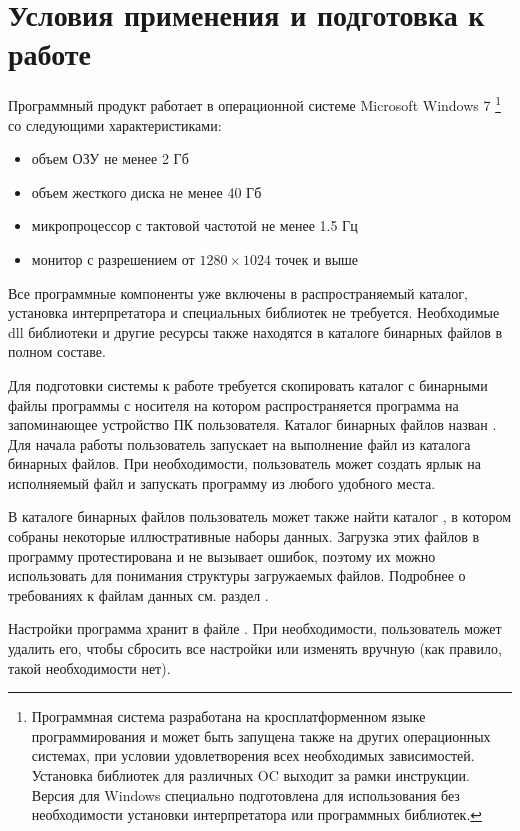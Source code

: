 \documentclass[12pt,tikz]{instruction}
\begin{document}
\section{Условия применения и подготовка к работе}

Программный продукт работает в операционной системе Microsoft Windows 7 \footnote{Программная система разработана на кросплатформенном языке программирования \Python и может быть запущена также на других операционных системах, при условии удовлетворения всех необходимых зависимостей. Установка библиотек для различных OC выходит за рамки инструкции. Версия для Windows специально подготовлена для использования без необходимости установки интерпретатора или программных библиотек.} со следующими характеристиками:
\begin{itemize}
	\item объем ОЗУ не менее 2 Гб
	\item объем жесткого диска не менее 40 Гб
	\item микропроцессор с тактовой частотой не менее 1.5 Гц
	\item монитор с разрешением от $1280 \times 1024$ точек и выше
\end{itemize}

Все программные компоненты уже включены в распространяемый каталог, установка интерпретатора \Python и специальных библиотек не требуется. Необходимые dll библиотеки и другие ресурсы также  находятся в каталоге бинарных файлов в полном составе.
	
Для подготовки системы к работе требуется скопировать каталог с бинарными файлы программы с носителя на котором распространяется программа на запоминающее устройство ПК пользователя.  Каталог бинарных файлов назван \BinCatalog. Для начала работы пользователь запускает на выполнение файл \ExeFile из каталога бинарных файлов. При необходимости, пользователь может создать ярлык на исполняемый файл и запускать программу из любого удобного места. 

В каталоге бинарных файлов пользователь может также найти каталог \DataCatalog, в котором собраны некоторые иллюстративные наборы данных. Загрузка этих файлов в программу протестирована и не вызывает ошибок, поэтому их можно использовать для понимания структуры загружаемых файлов. Подробнее о требованиях к файлам данных см. раздел .

Настройки программа хранит в файле \SettingsFile. При необходимости, пользователь может удалить его, чтобы сбросить все настройки или изменять вручную (как правило, такой необходимости нет). 
 
\end{document}
